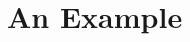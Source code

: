 \documentclass[submission,copyright,creativecommons]{eptcs}
\begin{document}
\section{An Example}
\label{sec:example}



\end{document}
